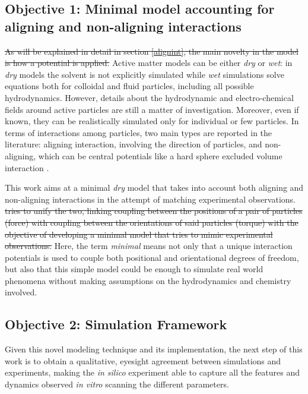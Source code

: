 \documentclass[../../master_thesis_np.tex]{subfiles}
\begin{document}
	\subsection{Objective 1: Minimal model accounting for aligning and non-aligning interactions}
	\sout{As will be explained in detail in section \ref{alignint}, the main novelty in the model is how a potential is applied. } 
	Active matter models can be either \emph{dry} or \emph{wet}: in \emph{dry} models the solvent is not explicitly simulated while \emph{wet} simulations solve equations both for colloidal and fluid particles, including all possible hydrodynamics. 
	However, details about the hydrodynamic and electro-chemical fields around active particles are still a matter of investigation.
	Moreover, even if known, they can be realistically simulated only for individual or few particles.
	In terms of interactions among particles, two main types are reported in the literature: aligning interaction, involving the direction of particles, and non-aligning, which can be central potentials like a hard sphere excluded volume interaction \cite{callegari_numerical_2019}. 
	
	This work aims at a minimal \emph{dry} model that takes into account both aligning and non-aligning interactions in the attempt of matching experimental observations. \sout{tries to unify the two, linking coupling between the positions of a pair of particles (force) with coupling between the orientations of said particles (torque) with the objective of developing a minimal model that tries to mimic experimental observations.}
	Here, the term \emph{minimal} means not only that a unique interaction potentials is used to couple both positional and orientational degrees of freedom, but also that this simple model could be enough to simulate real world phenomena without making assumptions on the hydrodynamics and chemistry involved. 
		
	\subsection{Objective 2: Simulation Framework} 
	Given this novel modeling technique and its implementation, the next step of this work is to obtain a qualitative, eyesight agreement between simulations and experiments, making the \emph{in silico} experiment able to capture all the features and dynamics observed \emph{in vitro} scanning the different parameters.
	
\end{document}
